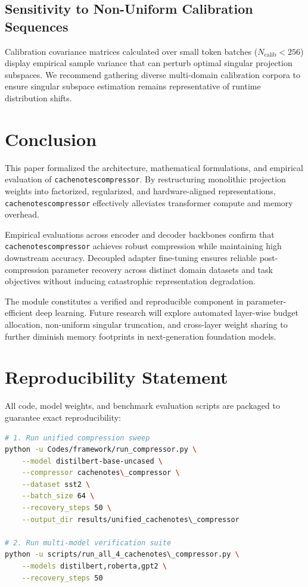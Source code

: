 \subsection{Sensitivity to Non-Uniform Calibration Sequences}
Calibration covariance matrices calculated over small token batches ($N_{\text{calib}} < 256$) display empirical sample variance that can perturb optimal singular projection subspaces. We recommend gathering diverse multi-domain calibration corpora to ensure singular subspace estimation remains representative of runtime distribution shifts.


\section{Conclusion}
This paper formalized the architecture, mathematical formulations, and empirical evaluation of \texttt{cachenotescompressor}. By restructuring monolithic projection weights into factorized, regularized, and hardware-aligned representations, \texttt{cachenotescompressor} effectively alleviates transformer compute and memory overhead.

Empirical evaluations across encoder and decoder backbones confirm that \texttt{cachenotescompressor} achieves robust compression while maintaining high downstream accuracy. Decoupled adapter fine-tuning ensures reliable post-compression parameter recovery across distinct domain datasets and task objectives without inducing catastrophic representation degradation.

The module constitutes a verified and reproducible component in parameter-efficient deep learning. Future research will explore automated layer-wise budget allocation, non-uniform singular truncation, and cross-layer weight sharing to further diminish memory footprints in next-generation foundation models.


\section{Reproducibility Statement}
All code, model weights, and benchmark evaluation scripts are packaged to guarantee exact reproducibility:
\begin{lstlisting}[language=bash]
# 1. Run unified compression sweep
python -u Codes/framework/run_compressor.py \
    --model distilbert-base-uncased \
    --compressor cachenotes\_compressor \
    --dataset sst2 \
    --batch_size 64 \
    --recovery_steps 50 \
    --output_dir results/unified_cachenotes\_compressor

# 2. Run multi-model verification suite
python -u scripts/run_all_4_cachenotes\_compressor.py \
    --models distilbert,roberta,gpt2 \
    --recovery_steps 50
\end{lstlisting}


